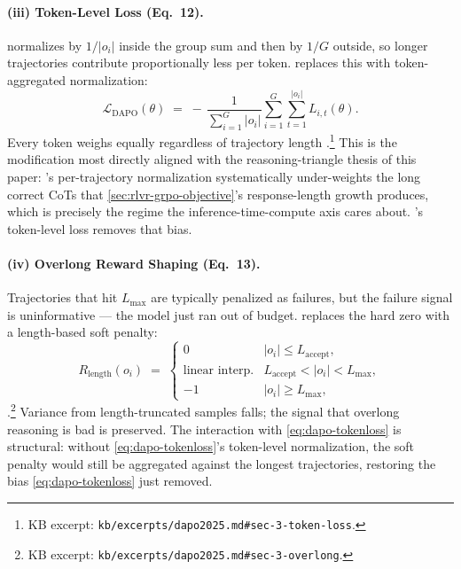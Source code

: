 \paragraph{(iii) Token-Level Loss (Eq.\ 12).}  normalizes by
$1/|o_i|$ inside the group sum and then by $1/G$ outside, so longer
trajectories contribute proportionally less per token.  replaces
this with token-aggregated normalization:
\begin{equation}
\mathcal{L}_{\mathrm{DAPO}}(\theta) \;=\; -\,\frac{1}{\sum_{i=1}^{G} |o_i|} \sum_{i=1}^{G} \sum_{t=1}^{|o_i|} L_{i,t}(\theta).
\label{eq:dapo-tokenloss}
\end{equation}
Every token weighs equally regardless of trajectory length
\citep[Eq.\ 12]{dapo2025}.\footnote{KB excerpt:
\nolinkurl{kb/excerpts/dapo2025.md#sec-3-token-loss}.} This is the
modification most directly aligned with the reasoning-triangle thesis
of this paper: 's per-trajectory normalization systematically
under-weights the long correct CoTs that
\cref{sec:rlvr-grpo-objective}'s response-length growth produces, which
is precisely the regime the inference-time-compute axis cares about.
's token-level loss removes that bias.

\paragraph{(iv) Overlong Reward Shaping (Eq.\ 13).} Trajectories that
hit $L_\mathrm{max}$ are typically penalized as failures, but the
failure signal is uninformative --- the model just ran out of budget.
 replaces the hard zero with a length-based soft penalty:
\begin{equation}
R_{\mathrm{length}}(o_i) \;=\; \begin{cases}
0 & |o_i| \le L_{\mathrm{accept}}, \\
\text{linear interp.} & L_{\mathrm{accept}} < |o_i| < L_\mathrm{max}, \\
-1 & |o_i| \ge L_\mathrm{max},
\end{cases}
\label{eq:dapo-overlong}
\end{equation}
\citep[Eq.\ 13]{dapo2025}.\footnote{KB excerpt:
\nolinkurl{kb/excerpts/dapo2025.md#sec-3-overlong}.} Variance from
length-truncated samples falls; the signal that overlong
reasoning is bad is preserved. The interaction with
\cref{eq:dapo-tokenloss} is structural: without
\cref{eq:dapo-tokenloss}'s token-level normalization, the soft penalty
would still be aggregated against the longest trajectories, restoring
the bias \cref{eq:dapo-tokenloss} just removed.

